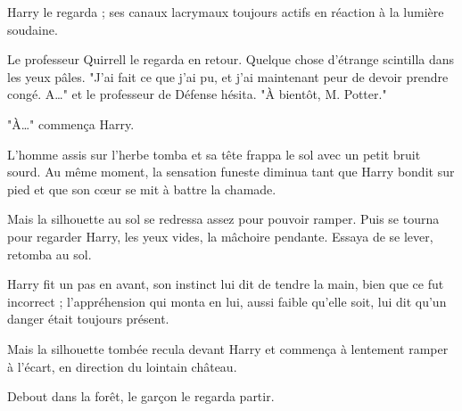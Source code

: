 Harry le regarda ; ses canaux lacrymaux toujours actifs en réaction à la lumière soudaine.

Le professeur Quirrell le regarda en retour. Quelque chose d'étrange scintilla dans les yeux pâles. "J'ai fait ce que j'ai pu, et j'ai maintenant peur de devoir prendre congé. A…" et le professeur de Défense hésita. "À bientôt, M. Potter."

"À…" commença Harry.

L'homme assis sur l'herbe tomba et sa tête frappa le sol avec un petit bruit sourd. Au même moment, la sensation funeste diminua tant que Harry bondit sur pied et que son cœur se mit à battre la chamade.

Mais la silhouette au sol se redressa assez pour pouvoir ramper. Puis se tourna pour regarder Harry, les yeux vides, la mâchoire pendante. Essaya de se lever, retomba au sol.

Harry fit un pas en avant, son instinct lui dit de tendre la main, bien que ce fut incorrect ; l'appréhension qui monta en lui, aussi faible qu'elle soit, lui dit qu'un danger était toujours présent.

Mais la silhouette tombée recula devant Harry et commença à lentement ramper à l'écart, en direction du lointain château.

Debout dans la forêt, le garçon le regarda partir.

